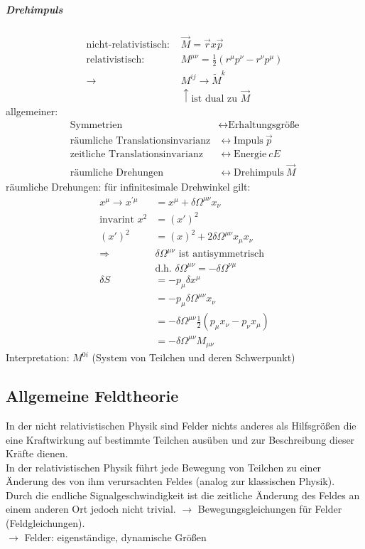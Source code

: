 \documentclass[a4paper]{article}
\begin{document}
\subparagraph{Drehimpuls}
\begin{align}
\text{nicht-relativistisch: } &\vec{M}=\vec{r}x\vec{p}\\
\text{relativistisch: } &M^{\mu\nu}=\frac{1}{2}(r^\mu p^\nu-r^\nu p^\mu)\\
\rightarrow &M^{ij}\rightarrow \tilde{M}^k \\
&\uparrow \text{ist dual zu } \vec{M}
\end{align}
allgemeiner:
\begin{align}
\text{Symmetrien} &\leftrightarrow \text{Erhaltungsgröße}\\
\text{räumliche Translationsinvarianz} &\leftrightarrow \text{Impuls}\ \vec{p}\\
\text{zeitliche Translationsinvarianz} &\leftrightarrow \text{Energie}\ cE\\
\text{räumliche Drehungen} &\leftrightarrow \text{Drehimpuls}\ \vec{M}
\end{align}
räumliche Drehungen: für infinitesimale Drehwinkel gilt:
\begin{align}
x^\mu \rightarrow x^{'\mu}&=x^\mu+\delta\Omega^{\mu\nu}x_\nu \\
\text{invarint } x^2&=(x')^{2}\\
(x')^2&=(x)^2+2\delta\Omega^{\mu\nu}x_\mu x_\nu\\
\Rightarrow &\delta\Omega^{\mu\nu} \text{ ist antisymmetrisch}\\
&\text{d.h. } \delta\Omega^{\mu\nu}=-\delta\Omega^{\nu\mu}\\
\delta S&=-p_\mu \delta x^\mu\\
&=-p_\mu \delta\Omega^{\mu\nu} x_\nu\\
&=-\delta\Omega^{\mu\nu} \frac{1}{2}(p_\mu x_\nu-p_\nu x_\mu)\\
&=-\delta\Omega^{\mu\nu}M_{\mu\nu}
\end{align}
Interpretation: $M^{0i}$ (System von Teilchen und deren Schwerpunkt)

\subsection{Allgemeine Feldtheorie}
In der nicht relativistischen Physik sind Felder nichts anderes als Hilfsgrößen
die eine Kraftwirkung auf bestimmte Teilchen ausüben und zur Beschreibung dieser
Kräfte dienen.\\ 
In der relativistischen Physik führt jede Bewegung von Teilchen zu einer
Änderung des von ihm verursachten Feldes (analog zur klassischen Physik).
Durch die endliche Signalgeschwindigkeit ist die zeitliche Änderung des Feldes
an einem anderen Ort jedoch nicht trivial. $\rightarrow$ Bewegungsgleichungen
für Felder (Feldgleichungen).\\
$\rightarrow$ Felder: eigenständige, dynamische Größen
\end{document}
